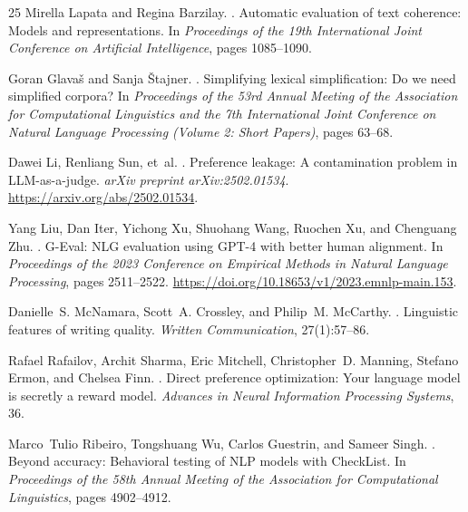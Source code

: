 \documentclass[11pt]{article}
\begin{document}
\begin{thebibliography}{25}
Mirella Lapata and Regina Barzilay.
.
\newblock Automatic evaluation of text coherence: Models and representations.
\newblock In \emph{Proceedings of the 19th International Joint Conference
on Artificial Intelligence}, pages 1085--1090.

Goran Glava{\v{s}} and Sanja {\v{S}}tajner.
.
\newblock Simplifying lexical simplification: Do we need simplified corpora?
\newblock In \emph{Proceedings of the 53rd Annual Meeting of the Association
for Computational Linguistics and the 7th International Joint Conference on
Natural Language Processing (Volume 2: Short Papers)}, pages 63--68.

Dawei Li, Renliang Sun, et~al.
.
\newblock Preference leakage: A contamination problem in {LLM}-as-a-judge.
\newblock \emph{arXiv preprint arXiv:2502.01534}.
\newblock \url{https://arxiv.org/abs/2502.01534}.

Yang Liu, Dan Iter, Yichong Xu, Shuohang Wang, Ruochen Xu, and Chenguang
Zhu.
.
\newblock G-{E}val: {NLG} evaluation using {GPT-4} with better human
alignment.
\newblock In \emph{Proceedings of the 2023 Conference on Empirical Methods
in Natural Language Processing}, pages 2511--2522.
\newblock \url{https://doi.org/10.18653/v1/2023.emnlp-main.153}.

Danielle~S. McNamara, Scott~A. Crossley, and Philip~M. McCarthy.
.
\newblock Linguistic features of writing quality.
\newblock \emph{Written Communication}, 27(1):57--86.


Rafael Rafailov, Archit Sharma, Eric Mitchell, Christopher~D. Manning,
Stefano Ermon, and Chelsea Finn.
.
\newblock Direct preference optimization: Your language model is secretly
a reward model.
\newblock \emph{Advances in Neural Information Processing Systems}, 36.

Marco~Tulio Ribeiro, Tongshuang Wu, Carlos Guestrin, and Sameer Singh.
.
\newblock Beyond accuracy: Behavioral testing of {NLP} models with
{CheckList}.
\newblock In \emph{Proceedings of the 58th Annual Meeting of the
Association for Computational Linguistics}, pages 4902--4912.


\end{thebibliography}
\end{document}

